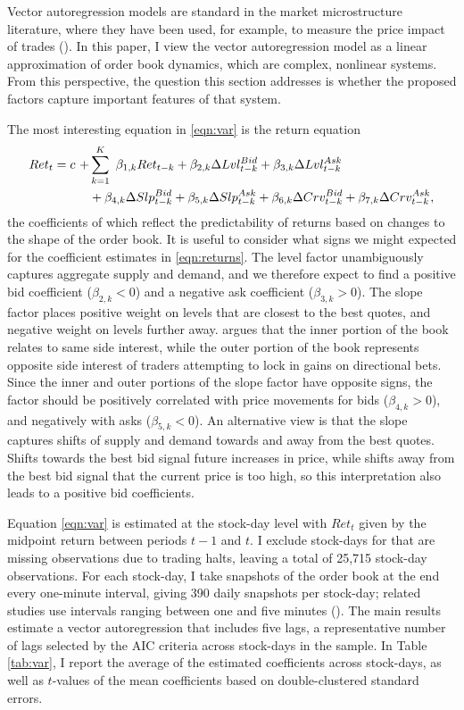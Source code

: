 Vector autoregression models are standard in the market microstructure literature, where they have been used, for example, to measure the price impact of trades (\citet{Hasbrouck1991}). In this paper, I view the vector autoregression model as a linear approximation of order book dynamics, which are complex, nonlinear systems. From this perspective, the question this section addresses is whether the proposed factors capture important features of that system.

The most interesting equation in \eqref{eqn:var} is the return equation
%
\begin{align}
\label{eqn:returns}
Ret_t = c \ + & \sum_{k=1}^{K} \ \beta_{1,k} Ret_{t-k} + \beta_{2, k} \Delta Lvl_{t-k}^{Bid} + \beta_{3, k} \Delta Lvl_{t-k}^{Ask} \notag \\
& + \beta_{4, k} \Delta Slp_{t-k}^{Bid} + \beta_{5, k} \Delta Slp_{t-k}^{Ask} + \beta_{6, k}\Delta Crv_{t-k}^{Bid} + \beta_{7, k} \Delta Crv_{t-k}^{Ask},
\end{align}
%
the coefficients of which reflect the predictability of returns based on changes to the shape of the order book. It is useful to consider what signs we might expected for the coefficient estimates in \eqref{eqn:returns}. The level factor unambiguously captures aggregate supply and demand, and we therefore expect to find a positive bid coefficient ($\beta_{2, k} < 0$) and a negative ask coefficient ($\beta_{3, k} > 0$). The slope factor places positive weight on levels that are closest to the best quotes, and negative weight on levels further away. \citet{Yuferova2015} argues that the inner portion of the book relates to same side interest, while the outer portion of the book represents opposite side interest of traders attempting to lock in gains on directional bets. Since the inner and outer portions of the slope factor have opposite signs, the factor should be positively correlated with price movements for bids ($\beta_{4,k} > 0$), and negatively with asks ($\beta_{5,k} < 0$). An alternative view is that the slope captures shifts of supply and demand towards and away from the best quotes. Shifts towards the best bid signal future increases in price, while shifts away from the best bid signal that the current price is too high, so this interpretation also leads to a positive bid coefficients.

Equation \eqref{eqn:var} is estimated at the stock-day level with $Ret_t$ given by the midpoint return between periods $t-1$ and $t$. I exclude stock-days for that are missing observations due to trading halts, leaving a total of 25,715 stock-day observations. For each stock-day, I take snapshots of the order book at the end every one-minute interval, giving 390 daily snapshots per stock-day; related studies use intervals ranging between one and five minutes (\citet{Yuferova2015,Cao2009}). The main results estimate a vector autoregression that includes five lags, a representative number of lags selected by the AIC criteria across stock-days in the sample. In Table \ref{tab:var}, I report the average of the estimated coefficients across stock-days, as well as $t$-values of the mean coefficients based on double-clustered standard errors.

